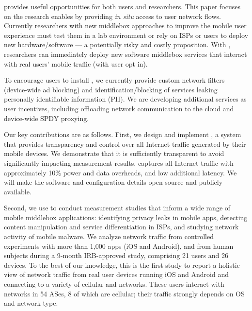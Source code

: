 

\meddle provides useful opportunities for both users and researchers.
This paper 
focuses on the research \meddle enables by providing \emph{in situ} access to 
user network flows. Currently researchers with new  
middlebox approaches to improve the mobile user experience must test them in a lab environment or 
rely on ISPs or users to deploy new hardware/software --- a potentially risky and costly 
proposition. With \meddle, researchers 
can immediately deploy new software middlebox services that interact with 
real users' mobile traffic (with user opt in). %

To encourage users to install \meddle, we currently provide custom 
network filters (\eg device-wide ad blocking) and identification/blocking of services leaking 
personally identifiable information (PII). We are developing additional services as user incentives, 
including offloading network communication to the cloud and device-wide SPDY proxying.

Our key contributions are as follows. First, we design and implement \meddle, a system that provides transparency 
and control 
over all Internet traffic generated by their 
mobile devices. We demonstrate that it is sufficiently transparent to avoid significantly impacting measurement results. 
\platname captures all Internet traffic with approximately 10\% power and data overheads, and low additional latency. 
We will make the \platname software and configuration details open source and publicly available.

Second, we use \meddle to conduct measurement studies that inform 
a wide range of mobile middlebox applications: identifying privacy leaks in mobile apps, detecting content 
manipulation and service differentiation in ISPs, and studying network activity of mobile malware. We analyze network traffic from controlled experiments with more than 1,000 apps (iOS and Android), 
and from human subjects during a 9-month IRB-approved study, comprising 21 users and 26 devices. To the best of our knowledge, this is the first study to report a holistic view of network traffic from real user devices running iOS and Android and 
connecting to a variety of cellular and \wifi networks. These users interact with networks in 54 ASes,
8 of which are cellular; their traffic strongly depends on OS and network type.


